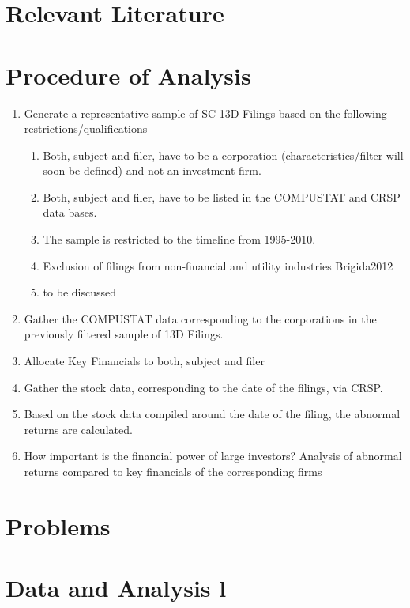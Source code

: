 \documentclass[12pt]{article}
\begin{document}
\section{Relevant Literature}

\section{Procedure of Analysis}

\begin{enumerate}
\item Generate a representative sample of SC 13D Filings based on the following restrictions/qualifications
	\begin{enumerate}
	\item Both, subject and filer, have to be a corporation (characteristics/filter will soon be defined) and not an investment firm.
  \item Both, subject and filer, have to be listed in the COMPUSTAT and CRSP data bases.
	\item The sample is restricted to the timeline from 1995-2010.
	\item Exclusion of filings from non-financial and utility industries {Brigida2012}
	\item to be discussed
	\end{enumerate}
\item Gather the COMPUSTAT data corresponding to the corporations in the previously filtered sample of 13D Filings.
\item Allocate Key Financials to both, subject and filer
\item Gather the stock data, corresponding to the date of the filings, via CRSP.
\item Based on the stock data compiled around the date of the filing, the abnormal returns are calculated. 
\item How important is the financial power of large investors? Analysis of abnormal returns compared to key financials of the corresponding firms

\end{enumerate}


\section{Problems}

\section{Data and Analysis l}

\printbibliography
\end{document}
